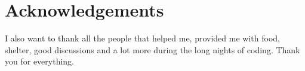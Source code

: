 \chapter*{Acknowledgements}

I also want to thank all the people that helped me, provided me with food, shelter, good discussions and a lot more during the long nights of coding. Thank you for everything.

